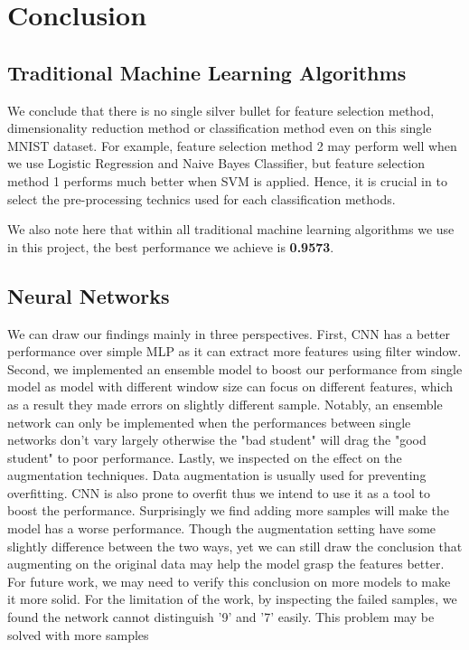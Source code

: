 \documentclass{article}
\begin{document}
\section{Conclusion}
\subsection{Traditional Machine Learning Algorithms}
We conclude that there is no single silver bullet for feature selection method, dimensionality reduction method or classification method even on this single MNIST dataset. For example, feature selection method 2 may perform well when we use Logistic Regression and Naive Bayes Classifier, but feature selection method 1 performs much better when SVM is applied. Hence, it is crucial in to select the pre-processing technics used for each classification methods. 

We also note here that within all traditional machine learning algorithms we use in this project, the best performance we achieve is \textbf{0.9573}. 
\subsection{Neural Networks}
We can draw our findings mainly in three perspectives. First, CNN has a better performance over simple MLP as it can extract more features using filter window. Second, we implemented an ensemble model to boost our performance from single model as model with different window size can focus on different features, which as a result they made errors on slightly different sample. Notably, an ensemble network can only be implemented when the performances between single networks don't vary largely otherwise the "bad student" will drag the "good student" to poor performance. Lastly, we inspected on the effect on the augmentation techniques. Data augmentation is usually used for preventing overfitting. CNN is also prone to overfit thus we intend to use it as a tool to boost the performance. Surprisingly we find adding more samples will make the model has a worse performance. Though the augmentation setting have some slightly difference between the two ways, yet we can still draw the conclusion that augmenting on the original data may help the model grasp the features better. For future work, we may need to verify this conclusion on more models to make it more solid. For the limitation of the work, by inspecting the failed samples, we found the network cannot distinguish '9' and '7' easily. This problem may be solved with more samples
\end{document}
